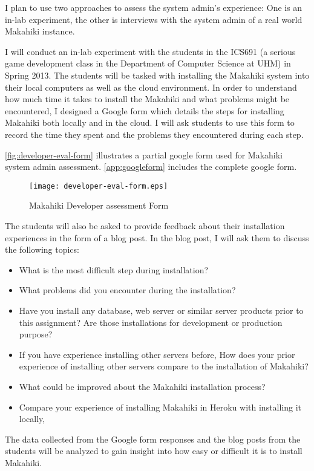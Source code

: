 I plan to use two approaches to assess the system admin's experience: One is an in-lab experiment, the other is interviews with the system admin of a real world Makahiki instance.

I will conduct an in-lab experiment with the students in the ICS691 (a serious game development class in the Department of Computer Science at UHM) in Spring 2013.  The students will be tasked with installing the Makahiki system into their local computers as well as the cloud environment. In order to understand how much time it takes to install the Makahiki and what problems might be encountered, I designed a Google form which details the steps for installing Makahiki both locally and in the cloud. I will ask students to use this form to record the time they spent and the problems they encountered during each step.

\autoref{fig:developer-eval-form} illustrates a partial google form used for Makahiki system admin assessment. \autoref{app:googleform} includes the complete google form.
\begin{figure}[ht!]
   \centering
   \texttt{[image: developer-eval-form.eps]}
   \caption{Makahiki Developer assessment Form}
   \label{fig:developer-eval-form}
\end{figure}

The students will also be asked to provide feedback about their installation experiences in the form of a blog post. In the blog post, I will ask them to discuss the following topics:
\begin{itemize}
\item What is the most difficult step during installation?
\item What problems did you encounter during the installation?
\item Have you install any database, web server or similar server products prior to this assignment? Are those installations for development or production purpose?
\item If you have experience installing other servers before, How does your prior experience of installing other servers compare to the installation of Makahiki?
\item What could be improved about the Makahiki installation process?
\item Compare your experience of installing Makahiki in Heroku with installing it locally,
\end{itemize}

The data collected from the Google form responses and the blog posts from the students will be analyzed to gain insight into how easy or difficult it is to install Makahiki. 

